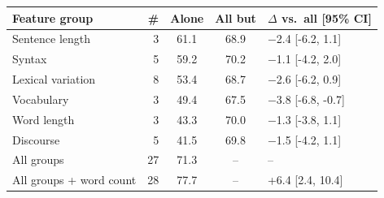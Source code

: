 \begin{tabular}{lrccl}
\toprule
Feature group & \# & Alone & All but & $\Delta$ vs.\ all [95\% CI] \\
\midrule
Sentence length & 3 & 61.1 & 68.9 & $-$2.4 [-6.2, 1.1] \\
Syntax & 5 & 59.2 & 70.2 & $-$1.1 [-4.2, 2.0] \\
Lexical variation & 8 & 53.4 & 68.7 & $-$2.6 [-6.2, 0.9] \\
Vocabulary & 3 & 49.4 & 67.5 & $-$3.8 [-6.8, -0.7] \\
Word length & 3 & 43.3 & 70.0 & $-$1.3 [-3.8, 1.1] \\
Discourse & 5 & 41.5 & 69.8 & $-$1.5 [-4.2, 1.1] \\
\midrule
All groups & 27 & 71.3 & -- & -- \\
All groups + word count & 28 & 77.7 & -- & +6.4 [2.4, 10.4] \\
\bottomrule
\end{tabular}
